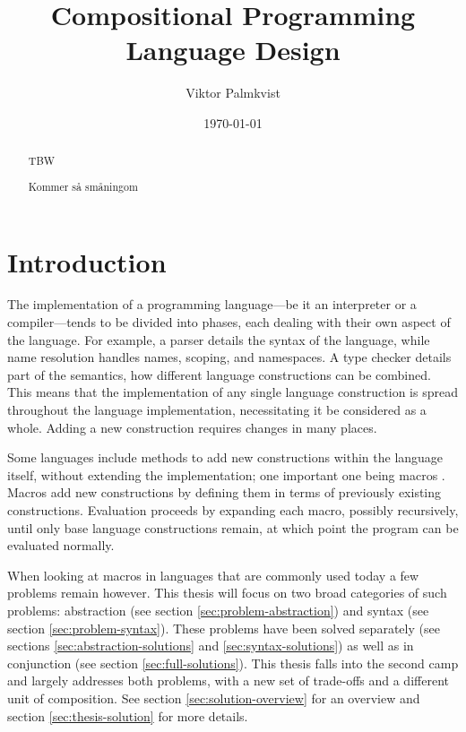 \documentclass{kththesis}
\title{Compositional Programming Language Design}
\author{Viktor Palmkvist}
\date{\today}
\begin{document}
\frontmatter

\titlepage

\begin{abstract}
TBW
\end{abstract}


\begin{otherlanguage}{swedish}
\begin{abstract}
Kommer så småningom
\end{abstract}
\end{otherlanguage}


\tableofcontents


\mainmatter


\chapter{Introduction}

The implementation of a programming language---be it an interpreter or a compiler---tends to be divided into phases, each dealing with their own aspect of the language. For example, a parser details the syntax of the language, while name resolution handles names, scoping, and namespaces. A type checker details part of the semantics, how different language constructions can be combined. This means that the implementation of any single language construction is spread throughout the language implementation, necessitating it be considered as a whole. Adding a new construction requires changes in many places.

Some languages include methods to add new constructions within the language itself, without extending the implementation; one important one being macros \cite{plt-tr1,Hickey2008,Matsakis2014}. Macros add new constructions by defining them in terms of previously existing constructions. Evaluation proceeds by expanding each macro, possibly recursively, until only base language constructions remain, at which point the program can be evaluated normally.

When looking at macros in languages that are commonly used today a few problems remain however. This thesis will focus on two broad categories of such problems: abstraction (see section \ref{sec:problem-abstraction}) and syntax (see section \ref{sec:problem-syntax}). These problems have been solved separately (see sections \ref{sec:abstraction-solutions} and \ref{sec:syntax-solutions}) as well as in conjunction (see section \ref{sec:full-solutions}). This thesis falls into the second camp and largely addresses both problems, with a new set of trade-offs and a different unit of composition. See section \ref{sec:solution-overview} for an overview and section \ref{sec:thesis-solution} for more details.
\end{document}

